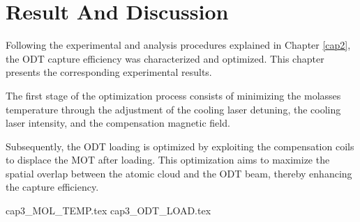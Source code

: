 \documentclass[../../thesis_main.tex]{subfiles}
\begin{document}
    \ifSubfilesClassLoaded{\tableofcontents}{}

    \setcounter{chapter}{2}
    \chapter{Result And Discussion}
    Following the experimental and analysis procedures explained in Chapter \ref{cap2}, the ODT capture efficiency was characterized and optimized. This chapter presents the corresponding experimental results.
    
    The first stage of the optimization process consists of  minimizing the molasses temperature through the adjustment of the cooling laser detuning, the cooling laser intensity, and the compensation magnetic field.

    Subsequently, the ODT loading is optimized by exploiting the compensation coils to displace the MOT after loading. This optimization aims to maximize the spatial overlap between the atomic cloud and the ODT beam, thereby enhancing the capture efficiency.

    {cap3_MOL_TEMP.tex}
    \clearpage
    {cap3_ODT_LOAD.tex}

    \ifSubfilesClassLoaded{\printbibliography}{}
\end{document}
